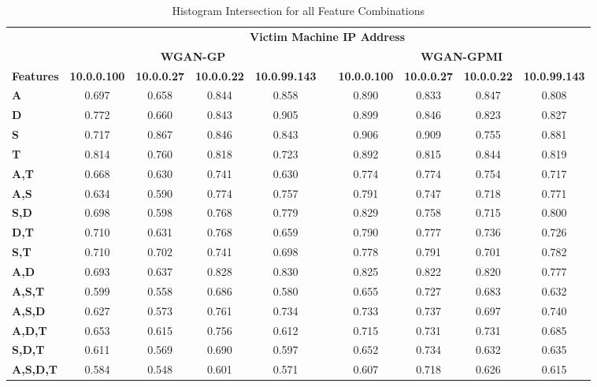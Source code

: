 \begin{table}[!htbp]
	\caption{Histogram Intersection for all Feature Combinations}
	\label{tab:inter}
	\centering
	\begin{adjustbox}{angle=90}
	\begin{tabular}{l|c|c|c|c|c|c|c|c|c|}
		\multicolumn{1}{c|}{} & \multicolumn{9}{c|}{\textbf{Victim Machine IP Address}} \\
		\multicolumn{1}{c|}{} & \multicolumn{4}{c|}{\textbf{WGAN-GP}} &  & \multicolumn{4}{c|}{\textbf{WGAN-GPMI}} \\
		\multicolumn{1}{c|}{\textbf{Features}} & \textbf{10.0.0.100} & \textbf{10.0.0.27} & \textbf{10.0.0.22} & \textbf{10.0.99.143} & \textbf{} & \textbf{10.0.0.100} & \textbf{10.0.0.27} & \textbf{10.0.0.22} & \textbf{10.0.99.143} \\ \hline
		\textbf{A} & 0.697 & 0.658 & 0.844 & 0.858 &  & 0.890 & 0.833 & 0.847 & 0.808 \\
		\textbf{D} & 0.772 & 0.660 & 0.843 & 0.905 &  & 0.899 & 0.846 & 0.823 & 0.827 \\
		\textbf{S} & 0.717 & 0.867 & 0.846 & 0.843 &  & 0.906 & 0.909 & 0.755 & 0.881 \\
		\textbf{T} & 0.814 & 0.760 & 0.818 & 0.723 &  & 0.892 & 0.815 & 0.844 & 0.819 \\ \hline
		\textbf{A,T} & 0.668 & 0.630 & 0.741 & 0.630 &  & 0.774 & 0.774 & 0.754 & 0.717 \\
		\textbf{A,S} & 0.634 & 0.590 & 0.774 & 0.757 &  & 0.791 & 0.747 & 0.718 & 0.771 \\
		\textbf{S,D} & 0.698 & 0.598 & 0.768 & 0.779 &  & 0.829 & 0.758 & 0.715 & 0.800 \\
		\textbf{D,T} & 0.710 & 0.631 & 0.768 & 0.659 &  & 0.790 & 0.777 & 0.736 & 0.726 \\
		\textbf{S,T} & 0.710 & 0.702 & 0.741 & 0.698 &  & 0.778 & 0.791 & 0.701 & 0.782 \\
		\textbf{A,D} & 0.693 & 0.637 & 0.828 & 0.830 &  & 0.825 & 0.822 & 0.820 & 0.777 \\ \hline
		\textbf{A,S,T} & 0.599 & 0.558 & 0.686 & 0.580 &  & 0.655 & 0.727 & 0.683 & 0.632 \\
		\textbf{A,S,D} & 0.627 & 0.573 & 0.761 & 0.734 &  & 0.733 & 0.737 & 0.697 & 0.740 \\
		\textbf{A,D,T} & 0.653 & 0.615 & 0.756 & 0.612 &  & 0.715 & 0.731 & 0.731 & 0.685 \\
		\textbf{S,D,T} & 0.611 & 0.569 & 0.690 & 0.597 &  & 0.652 & 0.734 & 0.632 & 0.635 \\ \hline
		\textbf{A,S,D,T} & 0.584 & 0.548 & 0.601 & 0.571 &  & 0.607 & 0.718 & 0.626 & 0.615 \\
	\end{tabular}
	\end{adjustbox}
\end{table}

